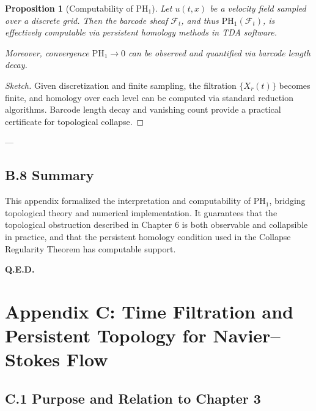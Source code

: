 \documentclass[11pt]{article}
\newtheorem{proposition}[theorem]{Proposition}
\begin{document}
\begin{proposition}[Computability of \( \mathrm{PH}_1 \)]
Let \( u(t,x) \) be a velocity field sampled over a discrete grid.  
Then the barcode sheaf \( \mathcal{F}_t \), and thus \( \mathrm{PH}_1(\mathcal{F}_t) \),  
is effectively computable via persistent homology methods in TDA software.

Moreover, convergence \( \mathrm{PH}_1 \to 0 \) can be observed and quantified via barcode length decay.
\end{proposition}

\begin{proof}[Sketch]
Given discretization and finite sampling, the filtration \( \{ X_r(t) \} \) becomes finite,  
and homology over each level can be computed via standard reduction algorithms.  
Barcode length decay and vanishing count provide a practical certificate for topological collapse.
\end{proof}

---

\subsection*{B.8 Summary}

This appendix formalized the interpretation and computability of \( \mathrm{PH}_1 \),  
bridging topological theory and numerical implementation.  
It guarantees that the topological obstruction described in Chapter 6  
is both observable and collapsible in practice, and that the persistent homology  
condition used in the Collapse Regularity Theorem has computable support.

\begin{flushright}
\textbf{Q.E.D.}
\end{flushright}




\section*{Appendix C: Time Filtration and Persistent Topology for Navier–Stokes Flow}

\subsection*{C.1 Purpose and Relation to Chapter 3}
\end{document}
